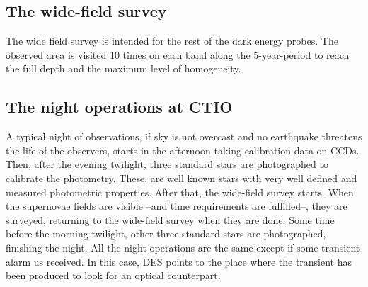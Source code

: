 \subsection*{The wide-field survey}
The wide field survey is intended for the rest of the dark energy probes. The observed area is visited 10 times on each band along the 5-year-period to reach the full depth and the maximum level of homogeneity.
\subsection*{The night operations at CTIO}
A typical night of observations, if sky is not overcast and no earthquake threatens the life of the observers, starts in the afternoon taking calibration data on CCDs. Then, after the evening twilight, three standard stars are photographed to calibrate the photometry. These, are well known stars with very well defined and measured photometric properties. After that, the wide-field survey starts. When the supernovae fields are visible --and time requirements are fulfilled--, they are surveyed, returning to the wide-field survey when they are done. Some time before the morning twilight, other three standard stars are photographed, finishing the night. All the night operations are the same except if some transient alarm us received. In this case,  DES points to the place where the transient has been produced to look for an optical counterpart.

